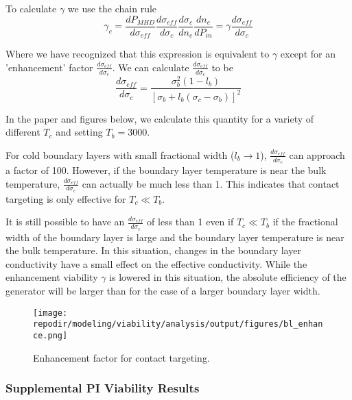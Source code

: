 To calculate $\gamma$ we use the chain rule
\[
\gamma_{c}=\frac{dP_{MHD}}{d\sigma_{eff}} \frac{d\sigma_{eff}}{d\sigma_{c}} \frac{d\sigma_{c}}{dn_e} \frac{dn_e}{dP_{in}}=\gamma \frac{d\sigma_{eff}}{d\sigma_{c}} \tag{13}
\]

Where we have recognized that this expression is equivalent to $\gamma$ except for an 'enhancement' factor $\frac{d\sigma_{eff}}{d\sigma_{c}}$. We can calculate $\frac{d\sigma_{eff}}{d\sigma_{c}}$ to be
\[
\frac{d\sigma_{eff}}{d\sigma_{c}}=\frac{\sigma_{b}^2 (1-l_{b})}{[\sigma_{b}+l_{b} (\sigma_{c}-\sigma_{b})]^2} \tag{14}
\]


In the paper and figures below, we calculate this quantity for a variety of different $T_{c}$ and setting $T_{b} = 3000$.

For cold boundary layers with small fractional width ($l_{b}\rightarrow1$), $\frac{d\sigma_{eff}}{d\sigma_{c}}$ can approach a factor of 100. However, if the boundary layer temperature is near the bulk temperature, $\frac{d\sigma_{eff}}{d\sigma_{c}}$ can actually be much less than 1. This indicates that contact targeting is only effective for $T_{c} \ll T_{b}$. 

It is still possible to have an $\frac{d\sigma_{eff}}{d\sigma_{c}}$ of less than 1 even if $T_{c} \ll T_{b}$ if the fractional width of the boundary layer is large and the  boundary layer temperature is near the bulk temperature. In this situation, changes in the boundary layer conductivity have a small effect on the effective conductivity. While the enhancement viability $\gamma$ is lowered in this situation, the absolute efficiency of the generator will be larger than for the case of a larger boundary layer width.



\begin{figure}[h]
    \texttt{[image: \\repodir/modeling/viability/analysis/output/figures/bl\_enhance.png]} 
    \caption{Enhancement factor for contact targeting.}
    \label{fig:SI_bl_enhance}
\end{figure}

\clearpage

\subsubsection{Supplemental PI Viability Results}

